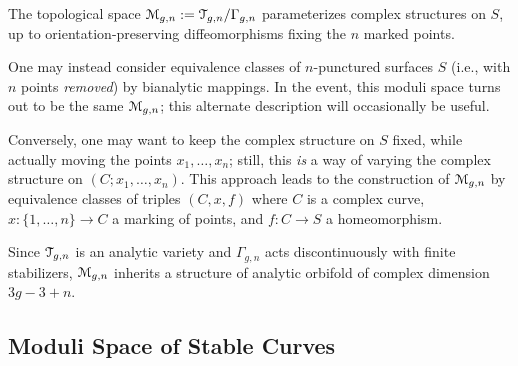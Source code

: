 The topological space $\mathcal{M}_{g,n} := \mathcal{T}_{g,n} / \Gamma_{g,n}$ parameterizes
complex structures on $S$, up to orientation-preserving
diffeomorphisms fixing the $n$ marked points.
\begin{remark}
  One may instead consider equivalence classes of $n$-punctured
  surfaces $S$ (i.e., with $n$ points \emph{removed}) by bianalytic
  mappings. In the event, this moduli space turns out to be the same
  $\mathcal{M}_{g,n}$; this alternate description will occasionally be
  useful.
\end{remark}
\begin{remark}
  Conversely, one may want to keep the complex structure on $S$ fixed,
  while actually moving the points $x_1, \ldots, x_n$; still, this
  \emph{is} a way of varying the complex structure on $(C; x_1, \dots,
  x_n)$. This approach leads to the construction of $\mathcal{M}_{g,n}$
  by equivalence classes of triples $(C, x, f)$ where $C$ is a complex
  curve, $x: \{1, \ldots, n\} \longrightarrow C$ a marking of points,
  and $f: C \to S$ a homeomorphism.
\end{remark}

Since $\mathcal{T}_{g,n}$ is an analytic variety and $\Gamma_{g,n}$ acts
discontinuously with finite stabilizers, $\mathcal{M}_{g,n}$ inherits a
structure of analytic orbifold of complex dimension $3g - 3 + n$.


\subsection{Moduli Space of Stable Curves}
\label{sec:moduli-space-stable}


